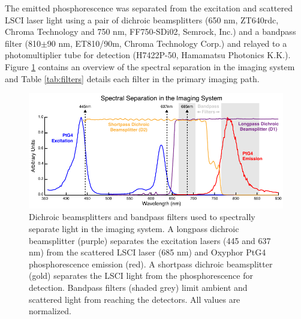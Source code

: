 The emitted phosphorescence was separated from the excitation and scattered LSCI laser light using a pair of dichroic beamsplitters (650 nm, ZT640rdc, Chroma Technology and 750 nm, FF750-SDi02, Semrock, Inc.) and a bandpass filter (810$\pm$90 nm, ET810/90m, Chroma Technology Corp.) and relayed to a photomultiplier tube for detection (H7422P-50, Hamamatsu Photonics K.K.). Figure \ref{fig:systemspectra} contains an overview of the spectral separation in the imaging system and Table \ref{tab:filters} details each filter in the primary imaging path.

\begin{figure}
    \includegraphics{figures/chapter_2/systemspectra.pdf}
    \caption{
        \label{fig:systemspectra}
        Dichroic beamsplitters and bandpass filters used to spectrally separate light in the imaging system. A longpass dichroic beamsplitter (purple) separates the excitation lasers (445 and 637 nm) from the scattered LSCI laser (685 nm) and Oxyphor PtG4 phosphorescence emission (red). A shortpass dichroic beamsplitter (gold) separates the LSCI light from the phosphorescence for detection. Bandpass filters (shaded grey) limit ambient and scattered light from reaching the detectors. All values are normalized.
    }
\end{figure}

